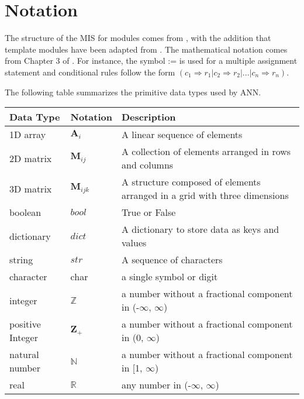 \documentclass[12pt, titlepage]{article}
\begin{document}
\section{Notation}


The structure of the MIS for modules comes from \citet{HoffmanAndStrooper1995},
with the addition that template modules have been adapted from
\cite{GhezziEtAl2003}.  The mathematical notation comes from Chapter 3 of
\citet{HoffmanAndStrooper1995}.  For instance, the symbol := is used for a
multiple assignment statement and conditional rules follow the form $(c_1
\Rightarrow r_1 | c_2 \Rightarrow r_2 | ... | c_n \Rightarrow r_n )$.

The following table summarizes the primitive data types used by ANN. 

\begin{center}
\renewcommand{\arraystretch}{1.2}
\noindent 
\begin{tabular}{l l p{7.5cm}} 
\toprule 
\textbf{Data Type} & \textbf{Notation} & \textbf{Description}\\ 
\midrule
1D array & $\mathbf{A}_{i}$ & A linear sequence of elements\\
2D matrix & $\mathbf{M}_{ij}$ &  A collection of elements arranged in rows and columns\\
3D matrix & $\mathbf{M}_{ijk}$ & A structure composed of elements arranged in a grid with three dimensions\\ 
boolean & $bool$ & True or False\\
dictionary & $dict$ & A dictionary to store data as keys and values\\
string & $str$ & A sequence of characters\\
character & char & a single symbol or digit\\
integer & $\mathbb{Z}$ & a number without a fractional component in (-$\infty$, $\infty$) \\
positive Integer & $\mathbf{Z}_{+}$ & a number without a fractional component in ($0$, $\infty$) \\
natural number & $\mathbb{N}$ & a number without a fractional component in [1, $\infty$) \\
real & $\mathbb{R}$ & any number in (-$\infty$, $\infty$)\\
\bottomrule
\end{tabular} 
\end{center}
\end{document}
